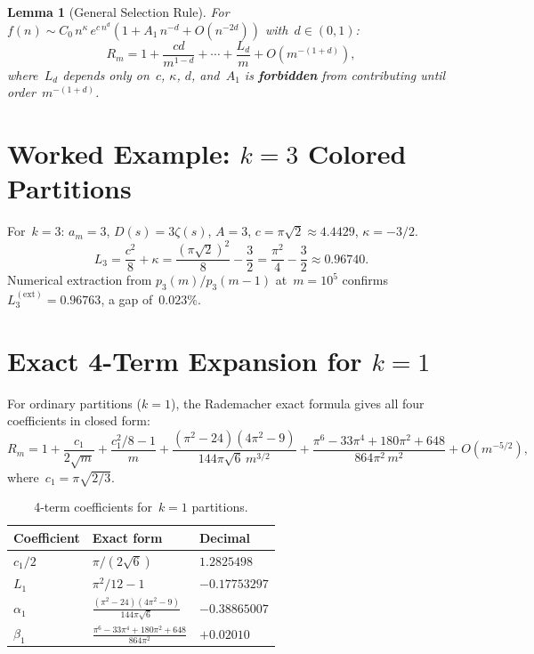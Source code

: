\documentclass[11pt,a4paper]{article}
\newtheorem{lemma}[theorem]{Lemma}
\begin{document}
\begin{lemma}[General Selection Rule]\label{lem:selection}
For~$f(n) \sim C_0\,n^{\kappa}\,e^{c\,n^d}(1 + A_1\,n^{-d} + O(n^{-2d}))$ with~$d \in (0,1)$:
\[
  R_m = 1 + \frac{cd}{m^{1-d}} + \cdots + \frac{L_d}{m} + O(m^{-(1+d)}),
\]
where~$L_d$ depends only on~$c$, $\kappa$, $d$, and~$A_1$ is \textbf{forbidden} from contributing until order~$m^{-(1+d)}$.
\end{lemma}

\section{Worked Example: \texorpdfstring{$k=3$}{k=3} Colored Partitions}\label{sec:example}

For~$k=3$: $a_m = 3$, $D(s) = 3\zeta(s)$, $A = 3$, $c = \pi\sqrt{2} \approx 4.4429$, $\kappa = -3/2$.
\[
  L_3 = \frac{c^2}{8} + \kappa = \frac{(\pi\sqrt{2})^2}{8} - \frac{3}{2} = \frac{\pi^2}{4} - \frac{3}{2} \approx 0.96740.
\]
Numerical extraction from $p_3(m)/p_3(m-1)$ at~$m = 10^5$ confirms~$L_3^{(\mathrm{ext})} = 0.96763$, a gap of~$0.023\%$.

\section{Exact 4-Term Expansion for \texorpdfstring{$k=1$}{k=1}}\label{sec:exact4}

For ordinary partitions ($k=1$), the Rademacher exact formula gives all four coefficients in closed form:
\begin{equation}\label{eq:4term}
  R_m = 1 + \frac{c_1}{2\sqrt{m}} + \frac{c_1^2/8 - 1}{m}
  + \frac{(\pi^2-24)(4\pi^2-9)}{144\pi\sqrt{6}\,m^{3/2}}
  + \frac{\pi^6 - 33\pi^4 + 180\pi^2 + 648}{864\pi^2\,m^2}
  + O(m^{-5/2}),
\end{equation}
where~$c_1 = \pi\sqrt{2/3}$.

\begin{table}[ht]
\centering
\caption{4-term coefficients for~$k=1$ partitions.}
\label{tab:4term}
\begin{tabular}{@{}lll@{}}
\toprule
Coefficient & Exact form & Decimal \\
\midrule
$c_1/2$ & $\pi/(2\sqrt{6})$ & $1.2825498$ \\
$L_1$ & $\pi^2/12 - 1$ & $-0.17753297$ \\
$\alpha_1$ & $\frac{(\pi^2-24)(4\pi^2-9)}{144\pi\sqrt{6}}$ & $-0.38865007$ \\
$\beta_1$ & $\frac{\pi^6-33\pi^4+180\pi^2+648}{864\pi^2}$ & $+0.02010$ \\
\bottomrule
\end{tabular}
\end{table}
\end{document}
